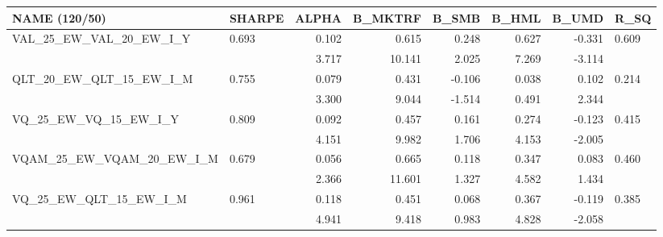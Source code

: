 \begin{tabular}{llrrrrrl}
\toprule
NAME (120/50) & SHARPE & ALPHA & B\_MKTRF & B\_SMB & B\_HML & B\_UMD & R\_SQ \\
\midrule
VAL\_25\_EW\_VAL\_20\_EW\_I\_Y & 0.693 & 0.102 & 0.615 & 0.248 & 0.627 & -0.331 & 0.609 \\
 &  & 3.717 & 10.141 & 2.025 & 7.269 & -3.114 &  \\
QLT\_20\_EW\_QLT\_15\_EW\_I\_M & 0.755 & 0.079 & 0.431 & -0.106 & 0.038 & 0.102 & 0.214 \\
 &  & 3.300 & 9.044 & -1.514 & 0.491 & 2.344 &  \\
VQ\_25\_EW\_VQ\_15\_EW\_I\_Y & 0.809 & 0.092 & 0.457 & 0.161 & 0.274 & -0.123 & 0.415 \\
 &  & 4.151 & 9.982 & 1.706 & 4.153 & -2.005 &  \\
VQAM\_25\_EW\_VQAM\_20\_EW\_I\_M & 0.679 & 0.056 & 0.665 & 0.118 & 0.347 & 0.083 & 0.460 \\
 &  & 2.366 & 11.601 & 1.327 & 4.582 & 1.434 &  \\
VQ\_25\_EW\_QLT\_15\_EW\_I\_M & 0.961 & 0.118 & 0.451 & 0.068 & 0.367 & -0.119 & 0.385 \\
 &  & 4.941 & 9.418 & 0.983 & 4.828 & -2.058 &  \\
\bottomrule
\end{tabular}
